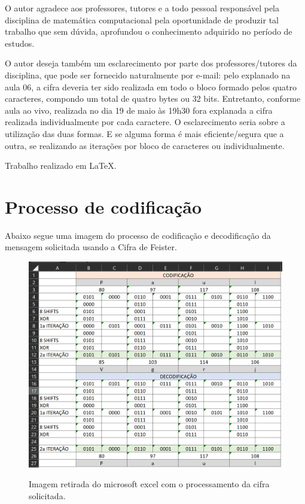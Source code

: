 \documentclass[a4paper,pra,aps,twocolumn,superscriptaddress,10pt,final]{revtex4-2}
\begin{document}
    \begin{acknowledgments}
        O autor agradece aos professores, tutores e a todo pessoal responsável pela disciplina de matemática computacional pela oportunidade de produzir tal trabalho que sem dúvida, aprofundou o conhecimento adquirido no período de estudos.

        O autor deseja também um esclarecimento por parte dos professores/tutores da disciplina, que pode ser fornecido naturalmente por e-mail: pelo explanado na aula 06, a cifra deveria ter sido realizada em todo o bloco formado pelos quatro caracteres, compondo um total de quatro bytes ou 32 bits. Entretanto, conforme aula ao vivo, realizada no dia 19 de maio às 19h30 fora explanada a cifra realizada individualmente por cada caractere. O esclarecimento seria sobre a utilização das duas formas. E se alguma forma é mais eficiente/segura que a outra, se realizando as iterações por bloco de caracteres ou individualmente.

        Trabalho realizado em \LaTeX.
    \end{acknowledgments}
% 


\appendix

\section{Processo de codificação}
\label{apx:code}

    Abaixo segue uma imagem do processo de codificação e decodificação da mensagem solicitada usando a Cifra de Feister.

\onecolumngrid

    \begin{figure}[!htpb]
        \centering
        \caption{Imagem retirada do microsoft excel com o processamento da cifra solicitada.}
        \includegraphics[width=\textwidth]{Tabela-cifra.png}
        \label{fig:Tabela-cifra}
    \end{figure}
\end{document}
